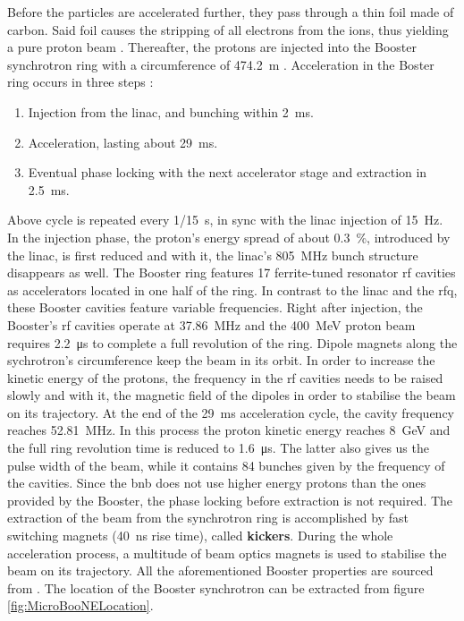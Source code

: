 Before the particles are accelerated further, they pass through a thin foil made of carbon. Said foil causes the stripping of all electrons from the  ions, thus yielding a pure proton beam \cite{BNBBooster1}. Thereafter, the protons are injected into the Booster synchrotron ring with a circumference of \SI{474.2}{\metre} \cite{BNBBooster2}. Acceleration in the Boster ring occurs in three steps \cite{BNBBooster1}:
\begin{enumerate}
    \item Injection from the \gls{linac}, and bunching within \SI{2}{\milli\second}.
    \item Acceleration, lasting about \SI{29}{\milli\second}.
    \item Eventual phase locking with the next accelerator stage and extraction in \SI{2.5}{\milli\second}.
\end{enumerate}
Above cycle is repeated every \SI{1/15}{\second}, in sync with the \gls{linac} injection of \SI{15}{\hertz}. In the injection phase, the proton's energy spread of about \SI{0.3}{\percent}, introduced by the \gls{linac}, is first reduced and with it, the \gls{linac}'s \SI{805}{\mega\hertz} bunch structure disappears as well. The Booster ring features \num{17} ferrite-tuned resonator \gls{rf} cavities as accelerators located in one half of the ring. In contrast to the \gls{linac} and the \gls{rfq}, these Booster cavities feature variable frequencies. Right after injection, the Booster's \gls{rf} cavities operate at \SI{37.86}{\mega\hertz} and the \SI{400}{\mega\electronvolt} proton beam requires \SI{2.2}{\micro\second} to complete a full revolution of the ring. Dipole magnets along the sychrotron's circumference keep the beam in its orbit. In order to increase the kinetic energy of the protons, the frequency in the \gls{rf} cavities needs to be raised slowly and with it, the magnetic field of the dipoles in order to stabilise the beam on its trajectory. At the end of the \SI{29}{\milli\second} acceleration cycle, the cavity frequency reaches \SI{52.81}{\mega\hertz}. In this process the proton kinetic energy reaches \SI{8}{\giga\electronvolt} and the full ring revolution time is reduced to \SI{1.6}{\micro\second}. The latter also gives us the pulse width of the beam, while it contains \num{84} bunches given by the frequency of the cavities. Since the \gls{bnb} does not use higher energy protons than the ones provided by the Booster, the phase locking before extraction is not required. The extraction of the beam from the synchrotron ring is accomplished by fast switching magnets (\SI{40}{\nano\second} rise time), called \textbf{kickers}. During the whole acceleration process, a multitude of beam optics magnets is used to stabilise the beam on its trajectory. All the aforementioned Booster properties are sourced from \cite{BNBBooster1,BNBBooster2}. The location of the Booster synchrotron can be extracted from figure \ref{fig:MicroBooNELocation}.


